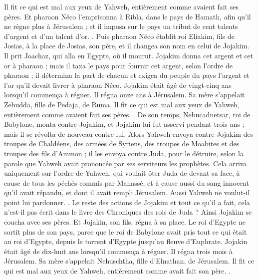 \begin{multicols}{2}
Il fit ce qui est mal aux yeux de Yahweh, entièrement comme avaient fait ses pères.
Et pharaon Néco l'emprisonna à Ribla, dans le pays de Hamath, afin qu'il ne règne plus à Jérusalem ; et il imposa sur le pays un tribut de cent talents d'argent et d'un talent d'or.
.
Puis pharaon Néco établit roi Eliakim, fils de Josias, à la place de Josias, son père, et il changea son nom en celui de Jojakim. Il prit Joachaz, qui alla en Egypte, où il mourut.
Jojakim donna cet argent et cet or à pharaon ; mais il taxa le pays pour fournir cet argent, selon l'ordre de pharaon ; il détermina la part de chacun et exigea du peuple du pays l'argent et l'or qu'il devait livrer à pharaon Néco.
Jojakim était âgé de vingt-cinq ans lorsqu'il commença à régner. Il régna onze ans à Jérusalem. Sa mère s'appelait Zebudda, fille de Pedaja, de Ruma.
Il fit ce qui est mal aux yeux de Yahweh, entièrement comme avaient fait ses pères.
.
\VerseOne{}De son temps, Nebucadnetsar, roi de Babylone, monta contre Jojakim, et Jojakim lui fut asservi pendant trois ans ; mais il se révolta de nouveau contre lui.
Alors Yahweh envoya contre Jojakim des troupes de Chaldéens, des armées de Syriens, des troupes de Moabites et des troupes des fils d'Ammon ; il les envoya contre Juda, pour le détruire, selon la parole que Yahweh avait prononcée par ses serviteurs les prophètes.
Cela arriva uniquement sur l'ordre de Yahweh, qui voulait ôter Juda de devant sa face, à cause de tous les péchés commis par Manassé,
et à cause aussi du sang innocent qu'il avait répandu, et dont il avait rempli Jérusalem. Aussi Yahweh ne voulut-il point lui pardonner.
.
Le reste des actions de Jojakim et tout ce qu'il a fait, cela n'est-il pas écrit dans le livre des Chroniques des rois de Juda ?
Ainsi Jojakim se coucha avec ses pères. Et Jojakin, son fils, régna à sa place.
Le roi d'Egypte ne sortit plus de son pays, parce que le roi de Babylone avait pris tout ce qui était au roi d'Egypte, depuis le torrent d'Egypte jusqu'au fleuve d'Euphrate.
Jojakin était âgé de dix-huit ans lorsqu'il commença à régner. Il régna trois mois à Jérusalem. Sa mère s'appelait Nehuschtha, fille d'Elnathan, de Jérusalem.
Il fit ce qui est mal aux yeux de Yahweh, entièrement comme avait fait son père.
.

\end{multicols}
